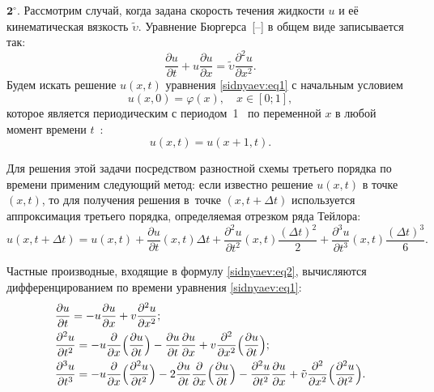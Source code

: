 \smallskip

{$\mathbf 2^\circ.$} Рассмотрим случай, когда задана скорость течения жидкости $u$ и её кинематическая вязкость $ \tilde{\upsilon}  $.
Уравнение Бюргерса~[--] в общем виде записывается так:
\begin{equation}
\label{sidnyaev:eq1}
\frac{\partial u}{\partial t}+u\frac{\partial
u}{\partial x}=  \tilde{\upsilon}  \frac{\partial ^2u}{\partial x^2}.
\end{equation}
Будем искать решение $u(x, t)$ уравнения \eqref{sidnyaev:eq1} с начальным условием 
$$u (x, 0)=\varphi(x), \quad x \in [0; 1],$$ 
которое является периодическим с периодом~1~ по переменной $x$ в любой момент времени  $t$~\cite{sidnyaev:bib12,sidnyaev:bib13}:
\begin{equation}
\label{sidney:(*)}
u(x, t) = u(x+1, t).
\end{equation}

Для решения этой задачи посредством разностной схемы третьего порядка по времени применим следующий метод: 
если известно решение $u(x,t)$ в точке $(x,t)$, то для получения решения в~точке  $(x,t+\Delta t)$ используется аппроксимация третьего порядка, определяемая отрезком ряда Тейлора:
\begin{equation}
\label{sidnyaev:eq2}
u (x,t+\Delta t)=u (x,t)+\frac{\partial u}{\partial t} (x,t)\Delta
t+\frac{\partial ^2u}{\partial t^2} (x,t)\frac{ (\Delta t)^2}{2}+\frac{\partial
^3u}{\partial t^3} (x,t)\frac{(\Delta t)^3}{6}.
\end{equation}

Частные производные, входящие в формулу \eqref{sidnyaev:eq2}, вычисляются дифференцированием
по времени уравнения \eqref{sidnyaev:eq1}:
\begin{align*}
&
\frac{\partial u}{\partial t}=-u\frac{\partial u}{\partial x}+ v 
\frac{\partial ^2u}{\partial x^2}; \\
& \frac{\partial ^2u}{\partial
t^2}=-u\frac{\partial }{\partial x}\Bigl( \frac{\partial u}{\partial t} \Bigr)-\frac{\partial u}{\partial t}\frac{\partial u}{\partial x}+ v 
\frac{\partial^2}{\partial x^2}\Bigl( \frac{\partial u}{\partial t}\Bigr); \\
&
\frac{\partial ^3u}{\partial t^3}=-u\frac{\partial }{\partial x}
\Bigl( \frac{\partial ^2u}{\partial t^2} \Bigr)-2\frac{\partial u}{\partial
t}\frac{\partial }{\partial x}\Bigr( \frac{\partial u}{\partial t}
\Bigr)-\frac{\partial ^2u}{\partial t^2}\frac{\partial u}{\partial
x}+  \tilde{\upsilon}  \frac{\partial^2}{\partial x^2}\Bigl( \frac{\partial
^2u}{\partial t^2} \Bigr).
\end{align*}

